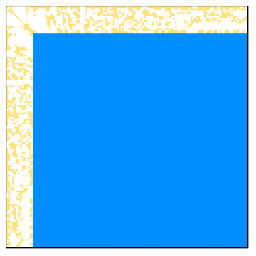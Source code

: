 \begin{figure}[ht!]
	\centering
	\begin{subfigure}[t]{0.45\textwidth}
		\centering
		\includegraphics[width=\textwidth, keepaspectratio]{images/ch03/input-matrices/decomposition-benchmarks/msc10848_icm32pp_nan.pdf}
		\label{Figure:comparing-decomposers-and-solvers->decomposition-project-benchmarks->decomposers-benchmark->accuracy-of-results-on-all-matrices->double-precision->matrix-with-metrics->ICM32PP-with-nan-results->msc10848->nonzero-element-pattern}
	\end{subfigure}\hspace{0.03\textwidth}
	\begin{subfigure}[t]{0.51\textwidth}
		\centering

\end{subfigure}
\end{figure}
